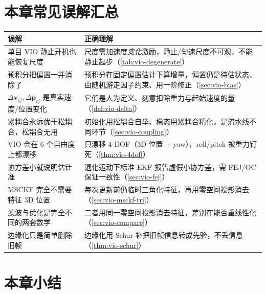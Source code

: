 \section*{本章常见误解汇总}
\begin{table}[H]\centering\small
\begin{tabular}{p{6.2cm}p{7.2cm}}
\toprule
误解 & 正确理解 \\
\midrule
单目 VIO 静止开机也能恢复尺度 & 尺度需加速度\emph{变化}激励，静止/匀速尺度不可观，不能静止起步（\cref{tab:vio-degenerate}） \\
预积分把偏置一并消除了 & 预积分在固定偏置估计下算增量，偏置仍是待估状态、由随机游走因子约束、用一阶修正（\cref{sec:vio-bias}） \\
$\Delta\mathbf{v}_{ij},\Delta\mathbf{p}_{ij}$ 是真实速度/位置变化 & 它们是人为定义、刻意扣除重力与起始速度的量（\cref{def:vio-delta}） \\
紧耦合永远优于松耦合，松耦合无用 & 初始化用松耦合自举、稳态用紧耦合精化，是流水线不同环节（\cref{sec:vio-coupling}） \\
VIO 会在 $6$ 个自由度上都漂移 & 只漂移 $4$-DOF（$3$D 位置 $+$ yaw），roll/pitch 被重力钉死（\cref{thm:vio-4dof}） \\
协方差小就说明估计准 & 退化运动下标准 EKF 报告虚假小协方差，需 FEJ/OC 保证一致性（\cref{sec:vio-fej}） \\
MSCKF 完全不需要特征 $3$D 位置 & 每次更新前仍临时三角化特征，再用零空间投影消去（\cref{sec:vio-msckf-tri}） \\
滤波与优化是完全不同的两套数学 & 二者用同一零空间投影消去特征，差别在能否重线性化（\cref{sec:vio-compare}） \\
边缘化只是简单删除旧帧 & 边缘化用 Schur 补把旧帧信息转成先验，不丢信息（\cref{thm:vio-schur}） \\
\bottomrule
\end{tabular}
\end{table}

\section*{本章小结}

